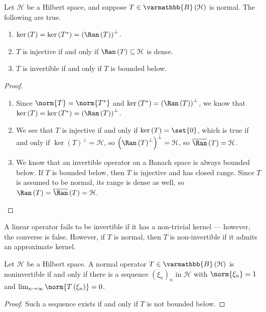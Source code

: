 \documentclass[10pt]{mypackage}
\renewcommand*{\mathbb}[1]{\varmathbb{#1}}
\newcommand{\B}{\mathbb{B}}
\begin{document}
\begin{proposition}
  Let $\mathcal{H}$ be a Hilbert space, and suppose $T\in \B\left(\mathcal{H}\right)$ is normal. The following are true.
  \begin{enumerate}[(1)]
    \item $\ker\left(T\right) = \ker\left(T^{\ast}\right) = \left(\Ran\left(T\right)\right)^{\perp}$.
    \item $T$ is injective if and only if $\Ran\left(T\right)\subseteq \mathcal{H}$ is dense.
    \item $T$ is invertible if and only if $T$ is bounded below.
  \end{enumerate}
\end{proposition}
\begin{proof}\hfill
  \begin{enumerate}[(1)]
    \item Since $\norm{T} = \norm{T^{\ast}}$ and $\ker\left(T^{\ast}\right) = \left(\Ran\left(T\right)\right)^{\perp}$, we know that $\ker\left(T\right) = \ker\left(T^{\ast}\right) = \left(\Ran\left(T\right)\right)^{\perp}$.
    \item We see that $T$ is injective if and only if $\ker\left(T\right) = \set{0}$, which is true if and only if $\ker\left(T\right)^{\perp} = \mathcal{H}$, so $\left(\Ran\left(T\right)^{\perp}\right)^{\perp} = \mathcal{H}$, so $\overline{\Ran}\left(T\right) = \mathcal{H}$.
    \item We know that an invertible operator on a Banach space is always bounded below. If $T$ is bounded below, then $T$ is injective and has closed range. Since $T$ is assumed to be normal, its range is dense as well, so $\Ran\left(T\right) = \overline{\Ran}\left(T\right) = \mathcal{H}$.
  \end{enumerate}
\end{proof}
A linear operator fails to be invertible if it has a non-trivial kernel --- however, the converse is false. However, if $T$ is normal, then $T$ is non-invertible if it admits an approximate kernel.
\begin{corollary}
  Let $\mathcal{H}$ be a Hilbert space. A normal operator $T\in \B\left(\mathcal{H}\right)$ is noninvertible if and only if there is a sequence $\left(\xi_n\right)_n$ in $\mathcal{H}$ with $\norm{\xi_n} = 1$ and $\lim_{n\rightarrow\infty}\norm{T\left(\xi_n\right)}=0$.
\end{corollary}
\begin{proof}
  Such a sequence exists if and only if $T$ is not bounded below.
\end{proof}
\end{document}
